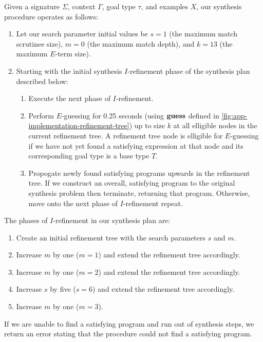 Given a signature $Σ$, context $Γ$, goal type $τ$, and examples $Χ$, our synthesis procedure operates as follows:
\begin{enumerate}
  \item Let our search parameter initial values be $s = 1$ (the maximum match scrutinee size), $m = 0$ (the maximum match depth), and $k = 13$ (the maximum $E$-term size).
  \item Starting with the initial synthesis $I$-refinement phase of the synthesis plan described below:
    \begin{enumerate}
      \item Execute the next phase of $I$-refinement.
      \item Perform $E$-guessing for 0.25 seconds (using $\mathbf{guess}$ defined in \autoref{fig:app-implementation-refinement-tree}) up to size $k$ at all elligible nodes in the current refinement tree.
        A refinement tree node is elligible for $E$-guessing if we have not yet found a satisfying expression at that node and its corresponding goal type is a base type $T$.
      \item Propogate newly found satisfying programs upwards in the refinement tree.
        If we construct an overall, satisfying program to the original synthesis problem then terminate, returning that program.
        Otherwise, move onto the next phase of $I$-refinement repeat.
    \end{enumerate}
\end{enumerate}
The phases of $I$-refinement in our synthesis plan are:
\begin{enumerate}
  \item Create an initial refinement tree with the search parameters $s$ and $m$.
  \item Increase $m$ by one ($m = 1$) and extend the refinement tree accordingly.
  \item Increase $m$ by one ($m = 2$) and extend the refinement tree accordingly.
  \item Increase $s$ by five ($s = 6$) and extend the refinement tree accordingly.
  \item Increase $m$ by one ($m = 3$).
\end{enumerate}
If we are unable to find a satisfying program and run out of synthesis steps, we return an error stating that the procedure could not find a satisfying program.


